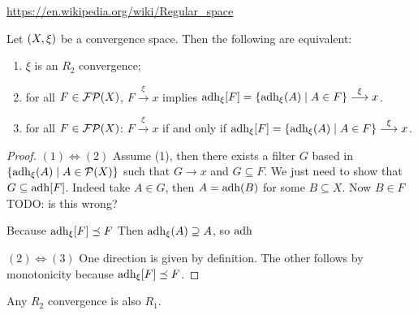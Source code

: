 \url{https://en.wikipedia.org/wiki/Regular_space}

\begin{proposition}
Let $\sSet{X,\xi}$ be a convergence space. Then the following are equivalent:
\begin{enumerate}
\item $\xi$ is an $R_2$ convergence;
\item for all $F\in\operatorname{\mathcal{FP}}(X)$, $F\overset{\xi}{\longrightarrow} x$ implies $\adh_\xi[F] = \setbuilder{\adh_\xi(A)}{A\in F} \overset{\xi}{\longrightarrow} x$.
\item for all $F\in\operatorname{\mathcal{FP}}(X)$: $F\overset{\xi}{\longrightarrow} x$ \textup{if and only if} $\adh_\xi[F] = \setbuilder{\adh_\xi(A)}{A\in F} \overset{\xi}{\longrightarrow} x$.
\end{enumerate}
\end{proposition}
\begin{proof}
$(1) \Leftrightarrow (2)$ Assume (1), then there exists a filter $G$ based in $\setbuilder{\adh_\xi(A)}{A\in\powerset(X)}$ such that $G\to x$ and $G\subseteq F$. We just need to show that $G\subseteq \operatorname{adh}[F]$. Indeed take $A\in G$, then $A = \operatorname{adh}(B)$ for some $B\subseteq X$. Now $B\in F$ TODO: is this wrong?

Because $\operatorname{adh}_\xi[F]\preceq F$ Then $\operatorname{adh}_\xi(A) \supseteq A$, so $\operatorname{adh}$ 

$(2) \Leftrightarrow (3)$ One direction is given by definition. The other follows by monotonicity because $\operatorname{adh}_\xi[F] \preceq F$.
\end{proof}

\begin{lemma}
Any $R_2$ convergence is also $R_1$.
\end{lemma}

